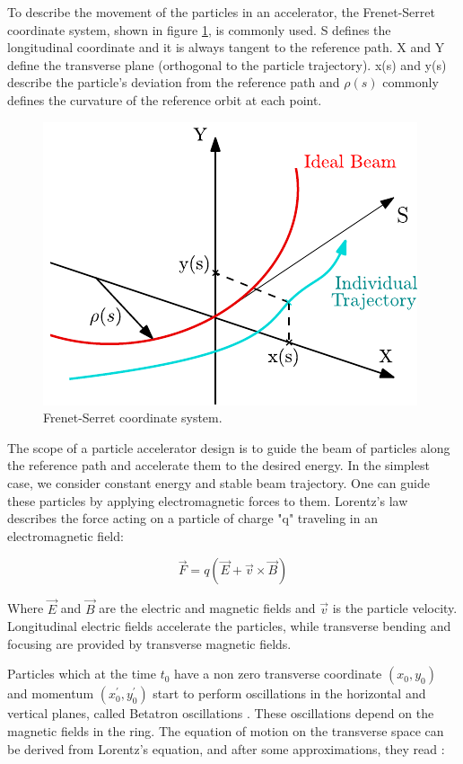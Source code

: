 To describe the movement of the particles in an accelerator, the Frenet-Serret coordinate system, shown in figure \ref{fig:CoordinateSystem}, is commonly used. S defines the longitudinal coordinate and it is always tangent to the reference path. X and Y define the transverse plane (orthogonal to the particle trajectory). x(s) and y(s) describe the particle's deviation from the reference path and $\rho(s)$ commonly defines the curvature of the reference orbit at each point. 


\begin{figure}[h]
    \centering
    \includegraphics[width=0.5\columnwidth]{Figure_CoordinateSystem/CoordinateSystem.pdf}
    \caption{Frenet-Serret coordinate system.}
    \label{fig:CoordinateSystem}
\end{figure}

The scope of a particle accelerator design is to guide the beam of particles along the reference path and accelerate them to the desired energy. In the simplest case, we consider constant energy and stable beam trajectory. One can guide these particles by applying electromagnetic forces to them. Lorentz's law describes the force acting on a particle of charge "q" traveling in an electromagnetic field:

\begin{equation}
    \vec{F} = q \left( \vec{E} + \vec{v} \times  \vec{B}\right)
    \label{eq:LorentzLaw}
\end{equation}

Where $\vec{E}$ and $\vec{B}$ are the electric and magnetic fields and $\vec{v}$ is the particle velocity. Longitudinal electric fields accelerate the particles, while transverse bending and focusing are provided by transverse magnetic fields. 

Particles which at the time $t_0$ have a non zero transverse coordinate $\left(x_0 , y_0 \right)$ and momentum $\left(x_{0}^{'} , y_{0}^{'} \right)$ start to perform oscillations in the horizontal and vertical planes,  called Betatron oscillations \parencite*[][]{ref:BookAccPhysics2}. These oscillations depend on the magnetic fields in the ring. The equation of motion on the transverse space can be derived from Lorentz's equation, and after some approximations, they read \parencite*[][]{ref:ApproxEqMotion}:

